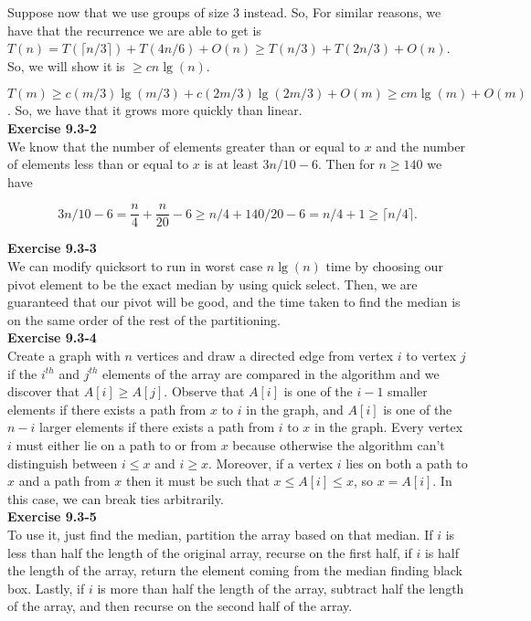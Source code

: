 \documentclass{article}
\begin{document}
Suppose now that we use groups of size $3$ instead. So, For similar reasons, we have that the recurrence we are able to get is $T(n) = T(\lceil n/3 \rceil) + T(4n/6) + O(n) \ge T(n/3)+ T(2n/3) +O(n)$. So, we will show it is $\ge cn\lg(n)$.

$T(m) \ge c (m/3)\lg(m/3) + c(2m/3) \lg(2m/3) +O(m) \ge  c m \lg(m) +O(m)$. So, we have that it grows more quickly than linear.\\

\noindent\textbf{Exercise 9.3-2}\\

We know that the number of elements greater than or equal to $x$ and the number of elements less than or equal to $x$ is at least $3n/10 - 6$.  Then for $n\geq 140$ we have

\[3n/10-6 = \frac{n}{4} + \frac{n}{20} - 6 \geq n/4 + 140/20 - 6 = n/4 + 1 \geq \lceil n/4\rceil.\]

\noindent\textbf{ Exercise 9.3-3} \\

We can modify quicksort to run in worst case $n\lg(n)$ time by choosing our pivot element to be the exact median by using quick select. Then, we are guaranteed that our pivot will be good, and the time taken to find the median is on the same order of the rest of the partitioning.\\

\noindent\textbf{Exercise 9.3-4}\\

Create a graph with $n$ vertices and draw a directed edge from vertex $i$ to vertex $j$ if the $i^{th}$ and $j^{th}$ elements of the array are compared in the algorithm and we discover that $A[i] \geq A[j]$.  Observe that $A[i]$ is one of the $i-1$ smaller elements if there exists a path from $x$ to $i$ in the graph, and $A[i]$ is one of the $n-i$ larger elements if there exists a path from $i$ to $x$ in the graph.  Every vertex $i$ must either lie on a path to or from $x$ because otherwise the algorithm can't distinguish between $i \leq x$ and $i \geq x$.  Moreover, if a vertex $i$ lies on both a path to $x$ and a path from $x$ then it must be such that $x \leq A[i] \leq x$, so $x = A[i]$. In this case, we can break ties arbitrarily. \\


\noindent\textbf{ Exercise 9.3-5} \\

To use it, just find the median, partition the array based on that median. If $i$ is less than half the length of the original array, recurse on the first half, if $i$ is half the length of the array, return the element coming from the median finding black box. Lastly, if $i$ is more than half the length of the array, subtract half the length of the array, and then recurse on the second half of the array.\\
\end{document}
